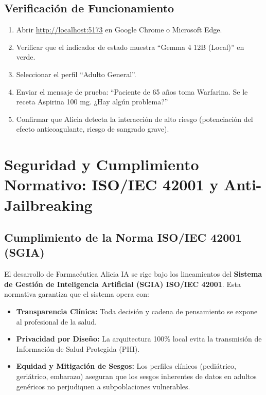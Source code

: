 \documentclass[12pt,a4paper]{article}
\begin{document}
\subsection{Verificación de Funcionamiento}

\begin{enumerate}
  \item Abrir \url{http://localhost:5173} en Google Chrome o Microsoft Edge.
  \item Verificar que el indicador de estado muestra ``Gemma 4 12B (Local)'' en verde.
  \item Seleccionar el perfil ``Adulto General''.
  \item Enviar el mensaje de prueba: ``Paciente de 65 años toma Warfarina. Se le receta
    Aspirina 100 mg. ¿Hay algún problema?''
  \item Confirmar que Alicia detecta la interacción de alto riesgo (potenciación del efecto
    anticoagulante, riesgo de sangrado grave).
\end{enumerate}

\newpage

\section{Seguridad y Cumplimiento Normativo: ISO/IEC 42001 y Anti-Jailbreaking}

\subsection{Cumplimiento de la Norma ISO/IEC 42001 (SGIA)}
El desarrollo de Farmacéutica Alicia IA se rige bajo los lineamientos del \textbf{Sistema de Gestión de Inteligencia Artificial (SGIA) ISO/IEC 42001}. Esta normativa garantiza que el sistema opera con:
\begin{itemize}
  \item \textbf{Transparencia Clínica:} Toda decisión y cadena de pensamiento se expone al profesional de la salud.
  \item \textbf{Privacidad por Diseño:} La arquitectura 100\% local evita la transmisión de Información de Salud Protegida (PHI).
  \item \textbf{Equidad y Mitigación de Sesgos:} Los perfiles clínicos (pediátrico, geriátrico, embarazo) aseguran que los sesgos inherentes de datos en adultos genéricos no perjudiquen a subpoblaciones vulnerables.
\end{itemize}
\end{document}

